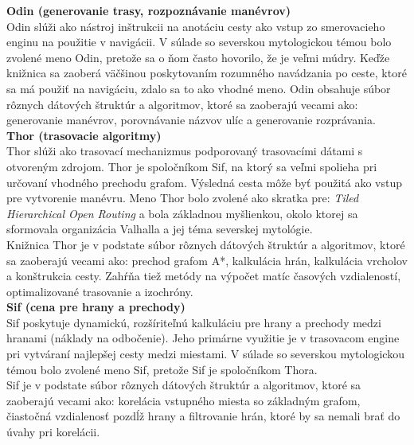 \noindent \textbf{Odin (generovanie trasy, rozpoznávanie manévrov)}\\
\indent Odin slúži ako nástroj inštrukcii na anotáciu cesty ako vstup zo smerovacieho enginu na použitie v navigácii. V súlade so severskou mytologickou témou bolo zvolené meno Odin, pretože sa o ňom často hovorilo, že je veľmi múdry. Keďže knižnica sa zaoberá väčšinou poskytovaním rozumného navádzania po ceste, ktoré sa má použiť na navigáciu, zdalo sa to ako vhodné meno. Odin obsahuje súbor rôznych dátových štruktúr a algoritmov, ktoré sa zaoberajú vecami ako: generovanie manévrov, porovnávanie názvov ulíc a generovanie rozprávania. \cite{odin}\\

\noindent \textbf{Thor (trasovacie algoritmy)}\\
\indent Thor slúži ako trasovací mechanizmus podporovaný trasovacími dátami s otvoreným zdrojom. Thor je spoločníkom Sif, na ktorý sa veľmi spolieha pri určovaní vhodného prechodu grafom. Výsledná cesta môže byť použitá ako vstup pre vytvorenie manévru. Meno Thor bolo zvolené ako skratka pre: \textit{Tiled Hierarchical Open Routing} a bola základnou myšlienkou, okolo ktorej sa sformovala organizácia Valhalla a jej téma severskej mytológie.\\
\indent Knižnica Thor je v podstate súbor rôznych dátových štruktúr a algoritmov, ktoré sa zaoberajú vecami ako: prechod grafom A*, kalkulácia hrán, kalkulácia vrcholov a konštrukcia cesty. Zahŕňa tiež metódy na výpočet matíc časových vzdialeností, optimalizované trasovanie a izochróny.\\

\noindent \textbf{Sif (cena pre hrany a prechody)}\\
\indent Sif poskytuje dynamickú, rozšíriteľnú kalkuláciu pre hrany a prechody medzi hranami (náklady na odbočenie). Jeho primárne využitie je v trasovacom engine pri vytváraní najlepšej cesty medzi miestami. V súlade so severskou mytologickou témou bolo zvolené meno Sif, pretože Sif je spoločníkom Thora.\\
\indent Sif je v podstate súbor rôznych dátových štruktúr a algoritmov, ktoré sa zaoberajú vecami ako: korelácia vstupného miesta so základným grafom, čiastočná vzdialenosť pozdĺž hrany a filtrovanie hrán, ktoré by sa nemali brať do úvahy pri korelácii.\\


